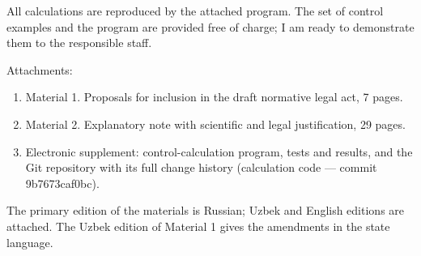 \documentclass[14pt,a4paper]{extarticle}
\begin{document}
All calculations are reproduced by the attached program. The set of control examples and the program are provided free of charge; I am ready to demonstrate them to the responsible staff.

\noindent Attachments:
\begin{enumerate}[leftmargin=1.27cm,label=\arabic*.]
\item Material 1. Proposals for inclusion in the draft normative legal act, 7 pages.
\item Material 2. Explanatory note with scientific and legal justification, 29 pages.
\item Electronic supplement: control-calculation program, tests and results, and the Git repository with its full change history (calculation code — commit 9b7673caf0bc).
\end{enumerate}
The primary edition of the materials is Russian; Uzbek and English editions are attached. The Uzbek edition of Material 1 gives the amendments in the state language.
\end{document}
